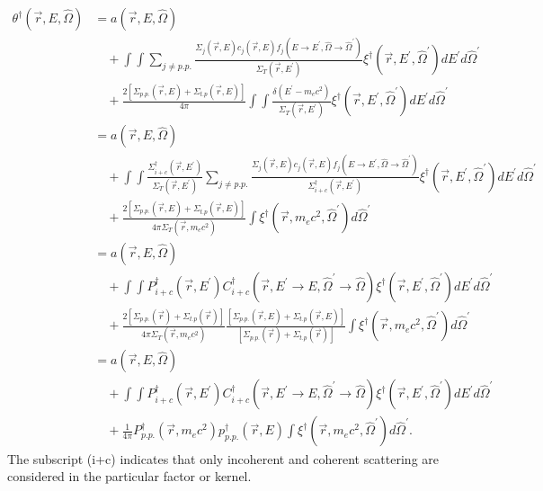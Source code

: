 \begin{align}
  \theta^{\dagger}(\vec{r},E,\hat{\Omega}) & = a(\vec{r},E,\hat{\Omega}) 
  \nonumber \\
  & \quad + \int\int \sum_{j \neq p.p.} \frac{\Sigma_j(\vec{r},E)c_j(\vec{r},E)
    f_j(E \to E^{'},\hat{\Omega} \to \hat{\Omega}^{'})}{\Sigma_T(\vec{r},E^{'})}
  \xi^{\dagger}(\vec{r},E^{'},\hat{\Omega}^{'}) dE^{'} d\hat{\Omega}^{'}
  \nonumber \\ 
  & \quad + \frac{2\left[\Sigma_{p.p.}(\vec{r},E)+\Sigma_{t.p}(\vec{r},E)\right]}
  {4\pi} \int\int \frac{\delta(E^{'}-m_ec^2)}{\Sigma_T(\vec{r},E^{'})}
  \xi^{\dagger}(\vec{r},E^{'},\hat{\Omega}^{'}) dE^{'} d\hat{\Omega}^{'}
  \nonumber \\
  & = a(\vec{r},E,\hat{\Omega}) \nonumber \\
  & \quad + \int\int \frac{\Sigma_{i+c}^{\dagger}(\vec{r},E^{'})}
            {\Sigma_T(\vec{r},E^{'})} 
            \sum_{j \neq p.p.} \frac{\Sigma_j(\vec{r},E)c_j(\vec{r},E)
              f_j(E \to E^{'},\hat{\Omega} \to \hat{\Omega}^{'})}
                {\Sigma_{i+c}^{\dagger}(\vec{r},E^{'})}
            \xi^{\dagger}(\vec{r},E^{'},\hat{\Omega}^{'}) dE^{'} d\hat{\Omega}^{'}
            \nonumber \\ 
  & \quad + \frac{2\left[\Sigma_{p.p.}(\vec{r},E)+\Sigma_{t.p}(\vec{r},E)\right]}
                 {4\pi \Sigma_T(\vec{r},m_ec^2)}
  \int \xi^{\dagger}(\vec{r},m_ec^2,\hat{\Omega}^{'}) d\hat{\Omega}^{'}
  \nonumber \\
  & = a(\vec{r},E,\hat{\Omega}) \nonumber \\
  & \quad + \int\int P_{i+c}^{\dagger}(\vec{r},E^{'})
  C_{i+c}^{\dagger}(\vec{r},E^{'} \to E, \hat{\Omega}^{'} \to \hat{\Omega})
  \xi^{\dagger}(\vec{r},E^{'},\hat{\Omega}^{'}) dE^{'} d\hat{\Omega}^{'}
  \nonumber \\
  & \quad + \frac{2\left[\Sigma_{p.p.}(\vec{r})+\Sigma_{t.p}(\vec{r})\right]}
            {4\pi\Sigma_T(\vec{r},m_ec^2)}
  \frac{\left[\Sigma_{p.p.}(\vec{r},E)+\Sigma_{t.p}(\vec{r},E)\right]}
  {\left[\Sigma_{p.p.}(\vec{r})+\Sigma_{t.p}(\vec{r})\right]} 
  \int \xi^{\dagger}(\vec{r},m_ec^2,\hat{\Omega}^{'}) d\hat{\Omega}^{'}
  \nonumber \\
  & = a(\vec{r},E,\hat{\Omega}) \nonumber \\
  & \quad + \int\int P_{i+c}^{\dagger}(\vec{r},E^{'})
  C_{i+c}^{\dagger}(\vec{r},E^{'} \to E, \hat{\Omega}^{'} \to \hat{\Omega})
  \xi^{\dagger}(\vec{r},E^{'},\hat{\Omega}^{'}) dE^{'} d\hat{\Omega}^{'}
  \nonumber \\
  & \quad + \frac{1}{4\pi}P_{p.p.}^{\dagger}(\vec{r},m_ec^2)
  p_{p.p.}^{\dagger}(\vec{r},E)
  \int \xi^{\dagger}(\vec{r},m_ec^2,\hat{\Omega}^{'}) d\hat{\Omega}^{'}.
  \nonumber 
\end{align}
The subscript (i+c) indicates that only incoherent and coherent scattering are
considered in the particular factor or kernel. 

